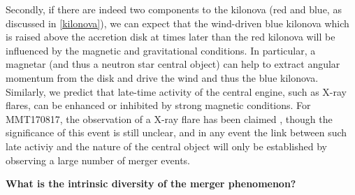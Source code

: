 Secondly, if there are indeed two components to the kilonova (red and blue, as discussed in \ref{kilonova}), we can expect that the wind-driven blue kilonova which is raised above the accretion disk at times later than the red kilonova will be influenced by the magnetic and gravitational conditions. In particular, a magnetar (and thus a neutron star central object) can help to extract angular momentum from the disk and drive the wind and thus the blue kilonova. Similarly, we predict that late-time activity of the central engine, such as X-ray flares, can be enhanced or inhibited by strong magnetic conditions. For MMT170817, the observation of a X-ray flare has been claimed \cite{58}, though the significance of this event is still unclear, and in any event the link between such late activiy and the nature of the central object will only be established by observing a large number of merger events.


\bf{What is the intrinsic diversity of the merger phenomenon? }
